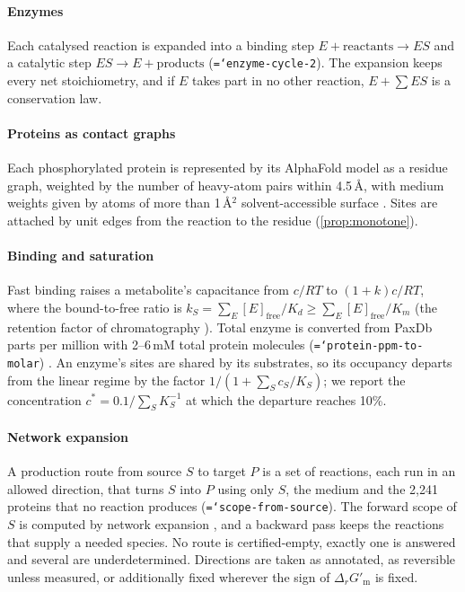 \documentclass[5p]{elsarticle}
\theoremstyle{definition}
\theoremstyle{plain}
\newcommand{\DGm}{\ensuremath{\Delta_r G'_{\mathrm{m}}}}
\newcommand{\st}[1]{\textsf{#1}}            %
\newcommand{\breakingtt}[1]{\texttt{\hyphenchar\font=`\-\relax #1}}  %
\newcommand{\conv}[1]{\breakingtt{#1}}      %
\begin{document}
\paragraph{Enzymes}
Each catalysed reaction is expanded into a binding step $E+\text{reactants}\to ES$ and a catalytic step $ES\to E+\text{products}$ (\conv{enzyme-cycle-2}).
The expansion keeps every net stoichiometry, and if $E$ takes part in no other reaction, $E+\sum ES$ is a conservation law.

\paragraph{Proteins as contact graphs}
Each phosphorylated protein is represented by its AlphaFold model \citep{jumper2021alphafold,varadi2022afdb} as a residue graph, weighted by the number of heavy-atom pairs within 4.5\,\AA, with medium weights given by atoms of more than 1\,\AA$^2$ solvent-accessible surface \citep{shrake1973environment}.
Sites are attached by unit edges from the reaction to the residue (\cref{prop:monotone}).

\paragraph{Binding and saturation}
Fast binding raises a metabolite's capacitance from $c/RT$ to $(1+k)c/RT$, where the bound-to-free ratio is $k_S=\sum_E[E]_{\mathrm{free}}/K_d\ge\sum_E[E]_{\mathrm{free}}/K_m$ (the retention factor of chromatography \citep{giddings1991unified}).
Total enzyme is converted from PaxDb parts per million with 2--6\,mM total protein molecules (\conv{protein-ppm-to-molar}) \citep{milo2013protein}.
An enzyme's sites are shared by its substrates, so its occupancy departs from the linear regime by the factor $1/(1+\sum_Sc_S/K_S)$; we report the concentration $c^\ast=0.1/\sum_SK_S^{-1}$ at which the departure reaches 10\%.

\paragraph{Network expansion}
A production route from source $S$ to target $P$ is a set of reactions, each run in an allowed direction, that turns $S$ into $P$ using only $S$, the medium and the 2{,}241 proteins that no reaction produces (\conv{scope-from-source}).
The forward scope of $S$ is computed by network expansion \citep{handorf2005expanding}, and a backward pass keeps the reactions that supply a needed species.
No route is \st{certified-empty}, exactly one is \st{answered} and several are \st{underdetermined}.
Directions are taken as annotated, as reversible unless measured, or additionally fixed wherever the sign of $\DGm$ is fixed.
\end{document}
